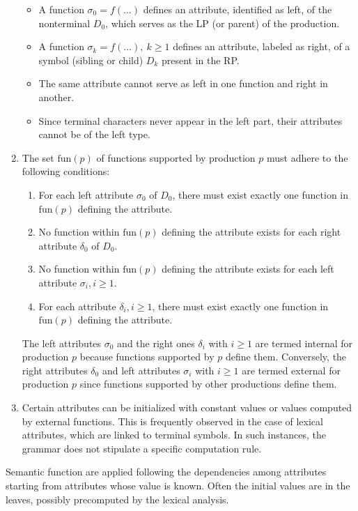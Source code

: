 \begin{enumerate}
\begin{itemize}
            \item A function $\sigma_0 = f(\ldots)$ defines an attribute, identified as left, of the nonterminal $D_0$, which serves as the LP (or parent) of the production.
            \item A function $\sigma_k = f(\ldots), \ k \geq 1$ defines an attribute, labeled as right, of a symbol (sibling or child) $D_k$ present in the RP.
            \item The same attribute cannot serve as left in one function and right in another.
            \item Since terminal characters never appear in the left part, their attributes cannot be of the left type.
        \end{itemize}
    \item The set $\text{fun}(p)$ of functions supported by production $p$ must adhere to the following conditions:
        \begin{enumerate}
            \item For each left attribute $\sigma_0$ of $D_0$, there must exist exactly one function in $\text{fun}(p)$ defining the attribute.
            \item No function within $\text{fun}(p)$ defining the attribute exists for each right attribute $\delta_0$ of $D_0$.
            \item No function within $\text{fun}(p)$ defining the attribute exists for each left attribute $\sigma_i, i \geq 1$.
            \item For each attribute $\delta_i, i \geq 1$, there must exist exactly one function in $\text{fun}(p)$ defining the attribute.
        \end{enumerate}
        The left attributes $\sigma_0$ and the right ones $\delta_i$ with $i \geq 1$ are termed internal for production $p$ because functions supported by $p$ define them. 
        Conversely, the right attributes $\delta_0$ and left attributes $\sigma_i$ with $i \geq 1$ are termed external for production $p$ since functions supported by other productions define them.    
    \item Certain attributes can be initialized with constant values or values computed by external functions. 
        This is frequently observed in the case of lexical attributes, which are linked to terminal symbols. 
        In such instances, the grammar does not stipulate a specific computation rule.
\end{enumerate}
Semantic function are applied following the dependencies among attributes starting from attributes whose value is known. 
Often the initial values are in the leaves, possibly precomputed by the lexical analysis. 

